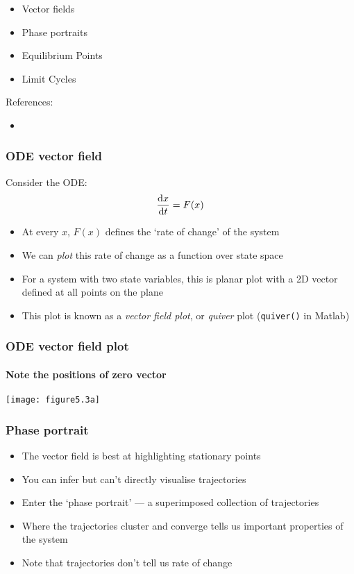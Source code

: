 \documentclass{beamer-control}
\begin{document}

\begin{SUMMARY}
\begin{itemize}
\item Vector fields
\item Phase portraits
\item Equilibrium Points
\item Limit Cycles
\end{itemize}
\vfill References:
\begin{itemize}
\item {}
\end{itemize}
\end{SUMMARY}




\begin{frame}
\frametitle{ODE vector field}
Consider the ODE:
\begin{align}
\frac{\mathrm{d} x}{\mathrm{d} t} = F(x)
\end{align}
\begin{itemize}
\item At every $x$, $F(x)$ defines the `rate of change' of the system
\item We can \emph{plot} this rate of change as a function over state space
\item For a system with two state variables, this is planar plot with a 2D vector defined at all points on the plane
\item This plot is known as a \emph{vector field plot}, or \emph{quiver} plot (\texttt{quiver()} in Matlab)
\end{itemize}
\end{frame}

\begin{frame}
\frametitle{ODE vector field plot}
\framesubtitle{Note the positions of zero vector}
\texttt{[image: figure5.3a]}
\end{frame}

\begin{frame}
\frametitle{Phase portrait}
\begin{itemize}
\item The vector field is best at highlighting stationary points
\item You can infer but can't directly visualise trajectories
\item Enter the `phase portrait' --- a superimposed collection of trajectories 
\item Where the trajectories cluster and converge tells us important properties of the system
\item Note that trajectories don't tell us rate of change
\end{itemize}
\end{frame}
\end{document}
